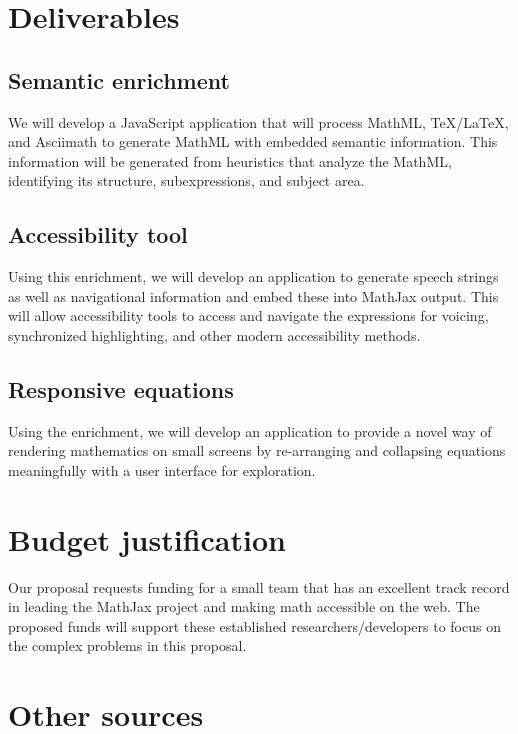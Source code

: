 \documentclass[12pt]{amsart}
\begin{document}
\section{Deliverables}

\subsection{Semantic enrichment}

We will develop a JavaScript application that will process MathML, \TeX/\LaTeX, 
and Asciimath to generate MathML with embedded semantic information. This 
information will be generated from heuristics that analyze the MathML, 
identifying its structure, subexpressions, and subject area. 

\subsection{Accessibility tool}

Using this enrichment, we will develop an application to generate speech 
strings as well as navigational information and embed these into MathJax output. 
This will allow accessibility tools to access and navigate the expressions for 
voicing, synchronized highlighting, and other modern accessibility methods. 

\subsection{Responsive equations}

Using the enrichment, we will develop an application to provide a novel way of 
rendering mathematics on small screens by re-arranging and collapsing equations 
meaningfully with a user interface for exploration.

\section{Budget justification}

Our proposal requests funding for a small team that has an excellent track 
record in leading the MathJax project and making math accessible on the web. 
The proposed funds will support these established researchers/developers 
to focus on the complex problems in this proposal. 


\section{Other sources}
\end{document}
